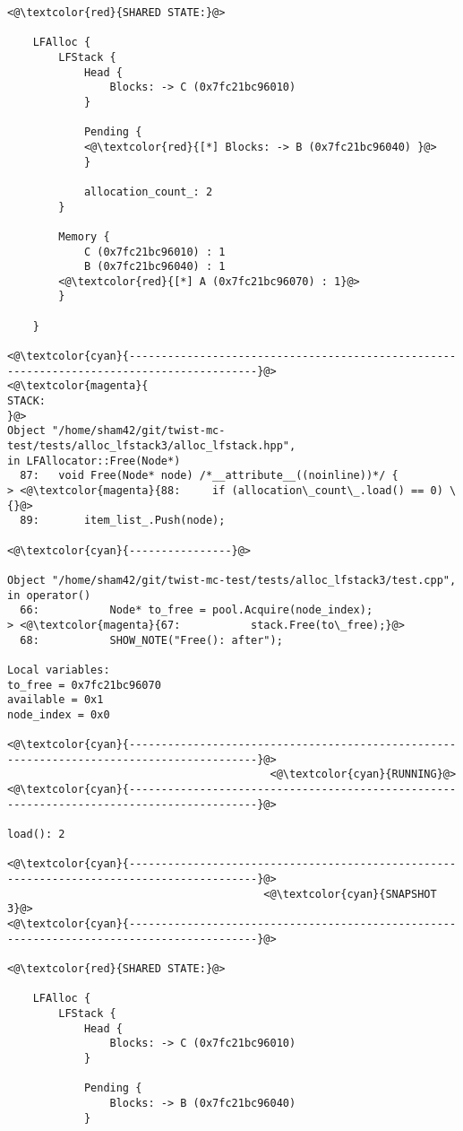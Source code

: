 \begin{adjustwidth}{-3.3cm}{-1cm}
\begin{allintypewriter}
\begin{multicols*}{2}
\begin{lstlisting}[numbers=none]
<@\textcolor{red}{SHARED STATE:}@>

    LFAlloc {
	    LFStack {
		    Head {
			    Blocks: -> C (0x7fc21bc96010) 
		    }

		    Pending {
			<@\textcolor{red}{[*] Blocks: -> B (0x7fc21bc96040) }@>
		    }

		    allocation_count_: 2
	    }

	    Memory {
		    C (0x7fc21bc96010) : 1
		    B (0x7fc21bc96040) : 1
		<@\textcolor{red}{[*] A (0x7fc21bc96070) : 1}@>
	    }

    }

<@\textcolor{cyan}{------------------------------------------------------------------------------------------}@>
<@\textcolor{magenta}{
STACK:
}@>
Object "/home/sham42/git/twist-mc-test/tests/alloc_lfstack3/alloc_lfstack.hpp",
in LFAllocator::Free(Node*)
  87:   void Free(Node* node) /*__attribute__((noinline))*/ {
> <@\textcolor{magenta}{88:     if (allocation\_count\_.load() == 0) \{}@>
  89:       item_list_.Push(node);

<@\textcolor{cyan}{----------------}@>

Object "/home/sham42/git/twist-mc-test/tests/alloc_lfstack3/test.cpp",
in operator()
  66:           Node* to_free = pool.Acquire(node_index);
> <@\textcolor{magenta}{67:           stack.Free(to\_free);}@>
  68:           SHOW_NOTE("Free(): after");

Local variables: 
to_free = 0x7fc21bc96070
available = 0x1
node_index = 0x0

<@\textcolor{cyan}{------------------------------------------------------------------------------------------}@>
                                         <@\textcolor{cyan}{RUNNING}@>
<@\textcolor{cyan}{------------------------------------------------------------------------------------------}@>

load(): 2

<@\textcolor{cyan}{------------------------------------------------------------------------------------------}@>
                                        <@\textcolor{cyan}{SNAPSHOT 3}@>
<@\textcolor{cyan}{------------------------------------------------------------------------------------------}@>

<@\textcolor{red}{SHARED STATE:}@>

    LFAlloc {
	    LFStack {
		    Head {
			    Blocks: -> C (0x7fc21bc96010) 
		    }

		    Pending {
			    Blocks: -> B (0x7fc21bc96040) 
		    }


\end{lstlisting}
\end{multicols*}
\end{allintypewriter}
\end{adjustwidth}
